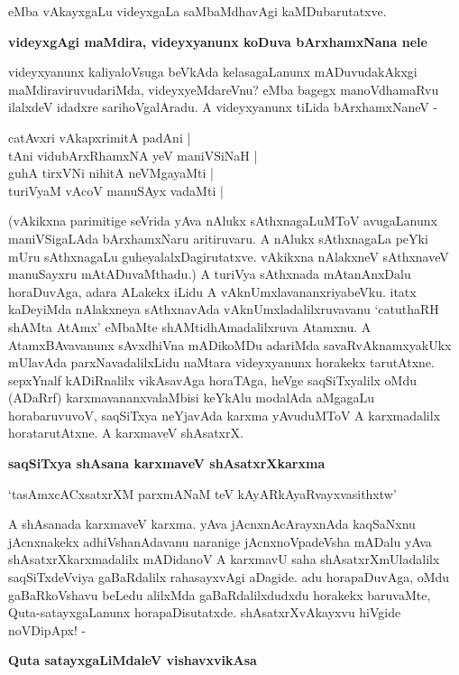 eMba vAkayxgaLu videyxgaLa saMbaMdhavAgi kaMDubarutatxve.

\noindent
\textbf{videyxgAgi maMdira, videyxyanunx koDuva bArxhamxNana nele}

videyxyanunx kaliyaloVsuga beVkAda kelasagaLanunx mADuvudakAkxgi maMdiraviruvudariMda, videyxyeMdareVnu? eMba bagegx manoVdhamaRvu ilalxdeV idadxre sarihoVgalAradu. A videyxyanunx tiLida bArxhamxNaneV - 

\begin{shloka}
catAvxri vAkapxrimitA padAni |\\\label{86}
tAni vidubArxRhamxNA yeV maniVSiNaH |\\
guhA tirxVNi nihitA neVMgayaMti |\\
turiVyaM vAcoV manuSAyx vadaMti |
\end{shloka}

(vAkikxna parimitige seVrida yAva nAlukx sAthxnagaLuMToV avugaLanunx maniVSigaLAda bArxhamxNaru aritiruvaru. A nAlukx sAthxnagaLa peYki mUru sAthxnagaLu guheyalalxDagirutatxve. vAkikxna nAlakxneV sAthxnaveV manuSayxru mAtADuvaMthadu.) A turiVya sAthxnada mAtanAnxDalu horaDuvAga, adara ALakekx iLidu A vAknUmxlavananxriyabeVku. itatx kaDeyiMda nAlakxneya sAthxnavAda vAknUmxladalilxruvavanu `catuthaRH shAMta AtAmx' eMbaMte shAMtidhAmadalilxruva Atamxnu. A AtamxBAvavanunx sAvxdhiVna mADikoMDu adariMda savaRvAknamxyakUkx mUlavAda parxNavadalilxLidu naMtara videyxyanunx horakekx tarutAtxne. sepxYnalf kADiRnalilx vikAsavAga horaTAga, heVge saqSiTxyalilx oMdu (ADaRrf) karxmavananxvalaMbisi keYkAlu modalAda aMgagaLu horabaruvuvoV, saqSiTxya neYjavAda karxma yAvuduMToV A karxmadalilx horatarutAtxne. A karxmaveV shAsatxrX.

\noindent
\textbf{saqSiTxya shAsana karxmaveV shAsatxrXkarxma}\label{page87}

\begin{shloka}
`tasAmxcACxsatxrXM parxmANaM teV kAyARkAyaRvayxvasithxtw'\label{87}
\end{shloka}

A shAsanada karxmaveV karxma. yAva jAcnxnAcArayxnAda kaqSaNxnu jAcnxnakekx adhiVshanAdavanu naranige jAcnxnoVpadeVsha mADalu yAva shAsatxrXkarxmadalilx mADidanoV A karxmavU saha shAsatxrXmUladalilx saqSiTxdeVviya gaBaRdalilx rahasayxvAgi aDagide. adu horapaDuvAga, oMdu gaBaRkoVshavu beLedu alilxMda gaBaRdalilxdudxdu horakekx baruvaMte, Quta-satayxgaLanunx horapaDisutatxde. shAsatxrXvAkayxvu hiVgide noVDipApx! - 

\noindent
\textbf{Quta satayxgaLiMdaleV vishavxvikAsa}\label{page87}

